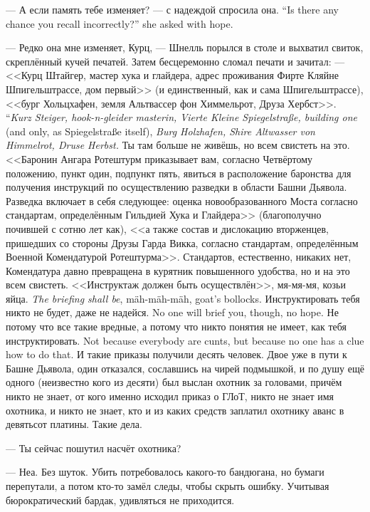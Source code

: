 {--- А если память тебе изменяет? --- с надеждой спросила она.}
{``Is there any chance you recall incorrectly?'' she asked with hope.}

--- Редко она мне изменяет, Курц, --- Шнелль порылся в столе и выхватил свиток, скреплённый кучей печатей.
Затем бесцеремонно сломал печати и зачитал:
{--- <<Курц Штайгер, мастер хука и глайдера, адрес проживания Фирте Кляйне Шпигельштрассе, дом первый>> (и единственный, как и сама Шпигельштрассе), <<бург Хольцхафен, земля Альтвассер фон Химмельрот, Друза Хербст>>.}
{``\textit{Kurz Steiger, hook-n-gleider masterin, Vierte Kleine Spiegelstraße, building one} (and only, as Spiegelstraße itself), \textit{Burg Holzhafen, Shire Altwasser von Himmelrot, Druse Herbst.}}
Ты там больше не живёшь, но всем свистеть на это.
<<Баронин Ангара Ротештурм приказывает вам, согласно Четвёртому положению, пункт один, подпункт пять, явиться в расположение баронства для получения инструкций по осуществлению разведки в области Башни Дьявола.
Разведка включает в себя следующее: оценка новообразованного Моста согласно стандартам, определённым Гильдией Хука и Глайдера>> (благополучно почившей с сотню лет как), <<а также состав и дислокацию вторженцев, пришедших со стороны Друзы Гарда Викка, согласно стандартам, определённым Военной Комендатурой Ротештурма>>.
Стандартов, естественно, никаких нет, Комендатура давно превращена в курятник повышенного удобства, но и на это всем свистеть.
{<<Инструктаж должен быть осуществлён>>, мя-мя-мя, козьи яйца.}
{\textit{The briefing shall be}, mäh-mäh-mäh, goat's bollocks.}
{Инструктировать тебя никто не будет, даже не надейся.}
{No one will brief you, though, no hope.}
{Не потому что все такие вредные, а потому что никто понятия не имеет, как тебя инструктировать.}
{Not because everybody are cunts, but because no one has a clue how to do that.}
И такие приказы получили десять человек.
Двое уже в пути к Башне Дьявола, один отказался, сославшись на чирей подмышкой, и по душу ещё одного (неизвестно кого из десяти) был выслан охотник за головами, причём никто не знает, от кого именно исходил приказ о ГЛоТ, никто не знает имя охотника, и никто не знает, кто и из каких средств заплатил охотнику аванс в девятьсот платины.
Такие дела.

--- Ты сейчас пошутил насчёт охотника?

--- Неа.
Без шуток.
Убить потребовалось какого-то бандюгана, но бумаги перепутали, а потом кто-то замёл следы, чтобы скрыть ошибку.
Учитывая бюрократический бардак, удивляться не приходится.

